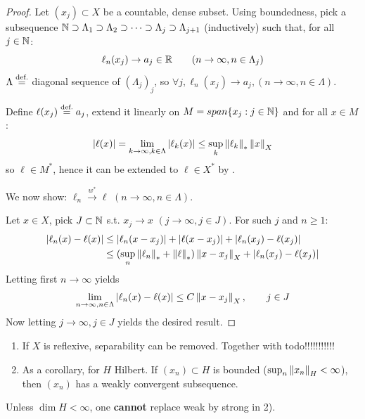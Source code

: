 \documentclass{article}
\begin{document}
\begin{proof}
    Let $(x_j) \subset X$ be a countable, dense subset. Using boundedness, pick a subsequence $\mathbb{N} \supset \Lambda_1 \supset \Lambda_2 \supset \cdots \supset \Lambda_j \supset \Lambda_{j+1}$ (inductively) such that, for all $j \in \mathbb{N}$:  
    $$
    \ell_n (x_j) \to a_j \in \mathbb{R} \qquad (n \to \infty, n\in \Lambda_j)
    $$  
    $\Lambda \stackrel{\text{def.}}{=}$ diagonal sequence of $(\Lambda_j)_j$, so $\forall j, \ell_n(x_j) \to a_j, (n\to \infty, n\in \Lambda)$. 
    
    Define $\ell(x_j) \stackrel{\text{def.}}{=} a_j$, extend it linearly on $M = span \{x_j: j\in \mathbb{N}\}$ and for all $x\in M$:  
    $$
    |\ell(x)| = \lim_{k\to \infty, k\in \Lambda} |\ell_k(x)| \leq \sup_k \left\|{\ell_k}\right\|_* \left\|{x}\right\|_{X}
    $$
    so $\ell \in M^*$, hence it can be extended to $\ell \in X^*$ by .  

    We now show: $\ell_n \overset{w^*}{\rightarrow} \ell$ $(n \to \infty, n \in \Lambda)$. 
    
    Let $x\in X$, pick $J \subset \mathbb{N}$ s.t. $x_j \to x$ $(j\to \infty, j \in J)$. For such $j$ and $n\geq 1$:  
    \begin{align*}
        |\ell_n(x)-\ell(x)| &\leq |\ell_n(x-x_j)| + |\ell(x-x_j)| + |\ell_n(x_j)-\ell(x_j)| \\
        &\leq (\sup_n \left\|{\ell_n}\right\|_* + \left\|{\ell}\right\|_*) \left\|{x-x_j}\right\|_X + |\ell_n(x_j)-\ell(x_j)|
    \end{align*}
    Letting first $n\to \infty$ yields  
    $$
    \lim_{n\to \infty, n\in \Lambda} |\ell_n(x)-\ell(x)| \leq C \left\|{x-x_j}\right\|_X, \qquad j \in J
    $$  
    Now letting $j\to \infty, j\in J$ yields the desired result.
\end{proof}  

\begin{remark}
    \begin{enumerate}[1)]
        \item If $X$ is reflexive, separability can be removed. Together with {\color{red} todo!!!!!!!!!!!}

        \item As a corollary, for $H$ Hilbert. If $(x_n) \subset H$ is bounded ($\sup_n \left\|{x_n}\right\|_H < \infty$), then $(x_n)$ has a weakly convergent subsequence.  
    \end{enumerate}
\end{remark}

Unless $\dim H<\infty$, one \textbf{cannot} replace weak by strong in 2).
\end{document}
